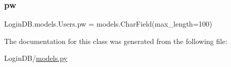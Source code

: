 \mbox{\label{class_login_d_b_1_1models_1_1_users_a0d4f3382681e0cd5d8ebb744862d43eb}} 
\subsubsection{\texorpdfstring{pw}{pw}}
{\footnotesize\ttfamily Login\+D\+B.\+models.\+Users.\+pw = models.\+Char\+Field(max\+\_\+length=100)\hspace{0.3cm}{\ttfamily [static]}}



The documentation for this class was generated from the following file\+:\begin{DoxyCompactItemize}
\item 
Login\+D\+B/\hyperlink{models_8py}{models.\+py}\end{DoxyCompactItemize}
